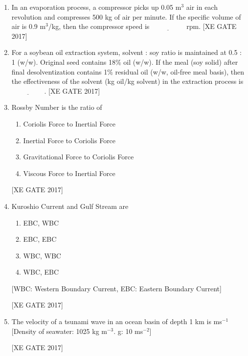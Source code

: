 \documentclass[journal,12pt,onecolumn]{IEEEtran}
\theoremstyle{remark}
\begin{document}
\begin{enumerate}
    \item In an evaporation process, a compressor picks up 0.05 m$^3$ air in each revolution and compresses 500 kg of air per minute. If the specific volume of air is 0.9 m$^3$/kg, then the compressor speed is $\underline{\hspace{2cm}}$ rpm.
    \hfill [XE GATE 2017]

    \item For a soybean oil extraction system, solvent : soy ratio is maintained at 0.5 : 1 (w/w). Original seed contains 18\% oil (w/w). If the meal (soy solid) after final desolventization contains 1\% residual oil (w/w, oil-free meal basis), then the effectiveness of the solvent (kg oil/kg solvent) in the extraction process is $\underline{\hspace{2cm}}$.
    \hfill [XE GATE 2017]

\item Rossby Number is the ratio of
\begin{multicols}{2}
\begin{enumerate}
    \item Coriolis Force to Inertial Force
    \item Inertial Force to Coriolis Force
    \item Gravitational Force to Coriolis Force
    \item Viscous Force to Inertial Force
\end{enumerate}
\end{multicols}

 \hfill [XE GATE 2017]


\item Kuroshio Current and Gulf Stream are
\begin{multicols}{2}
\begin{enumerate}
    \item EBC, WBC
    \item EBC, EBC
    \item WBC, WBC
    \item WBC, EBC
\end{enumerate}
\end{multicols}
[WBC: Western Boundary Current, EBC: Eastern Boundary Current]

 \hfill [XE GATE 2017]


\item The velocity of a tsunami wave in an ocean basin of depth 1 km is \quad ms$^{-1}$
[Density of seawater: 1025 kg m$^{-3}$. g: 10 ms$^{-2}$]

\hfill [XE GATE 2017]


\end{enumerate}
\end{document}
